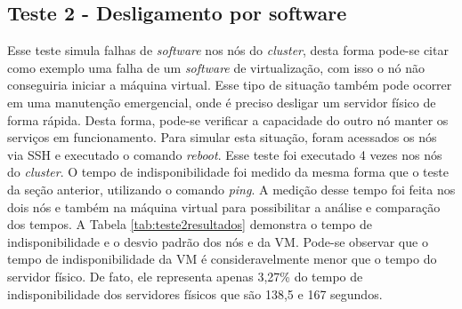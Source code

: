 
% 


\subsection{Teste 2 - Desligamento por software}

Esse teste simula falhas de \textit{software} nos nós do \textit{cluster}, desta forma pode-se citar como exemplo uma falha de um \textit{software} 
de virtualização, com isso o nó não conseguiria iniciar a máquina virtual. Esse tipo de situação também pode ocorrer em uma manutenção emergencial, 
onde é preciso desligar um servidor físico de forma rápida. Desta forma, pode-se verificar a capacidade do outro nó manter os serviços
em funcionamento. Para simular esta situação, foram acessados os nós via \ac{SSH} e executado o comando \textit{reboot}.
Esse teste foi executado 4 vezes nos nós do \textit{cluster}. O tempo de indisponibilidade foi medido da mesma forma que o teste da seção anterior,
utilizando o comando \textit{ping}. A medição desse tempo foi feita nos dois nós e também na máquina virtual para possibilitar a análise e 
comparação dos tempos. A Tabela \ref{tab:teste2resultados} demonstra o tempo de indisponibilidade e o desvio padrão dos nós e da \ac{VM}. 
Pode-se observar que o tempo de indisponibilidade da \ac{VM} é consideravelmente menor que o tempo do servidor físico. De fato, ele representa 
apenas 3,27\% do tempo de indisponibilidade dos servidores físicos que são 138,5 e 167 segundos. 

